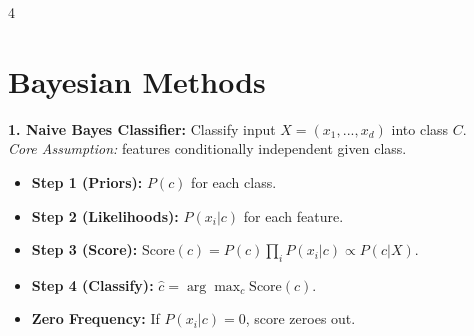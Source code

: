 \documentclass[9pt]{extarticle}
\begin{document}
\begin{multicols*}{4}
\section*{Bayesian Methods} 
\textbf{1. Naive Bayes Classifier:} Classify input $X = (x_1, ..., x_d)$ into class $C$.\\
\textit{Core Assumption:} features conditionally independent given class.
\begin{itemize}
    \item \textbf{Step 1 (Priors):} $P(c)$ for each class.
    \item \textbf{Step 2 (Likelihoods):} $P(x_i|c)$ for each feature.
    \item \textbf{Step 3 (Score):} $\text{Score}(c) = P(c) \prod_i P(x_i|c) \propto P(c|X)$.
    \item \textbf{Step 4 (Classify):} $\hat{c} = \arg\max_c \text{Score}(c)$.
    \item \textbf{Zero Frequency:} If $P(x_i|c)=0$, score zeroes out.
\end{itemize}
 

\end{multicols*}
\end{document}
